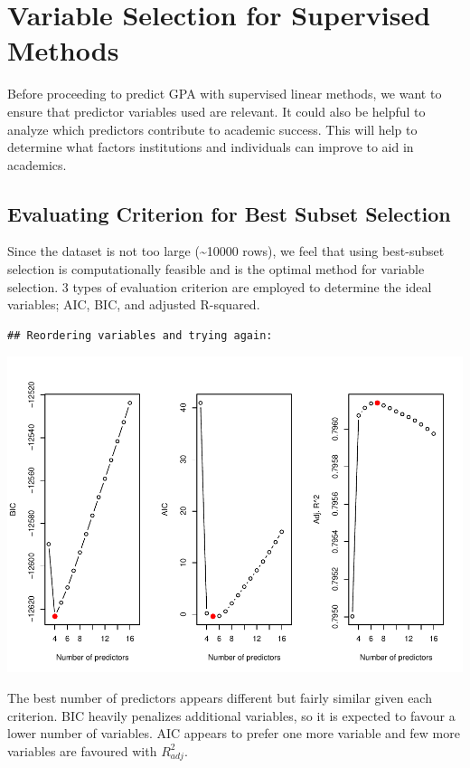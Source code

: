 \documentclass[
]{article}
\begin{document}
\section{Variable Selection for Supervised
Methods}\label{variable-selection-for-supervised-methods}

Before proceeding to predict GPA with supervised linear methods, we want
to ensure that predictor variables used are relevant. It could also be
helpful to analyze which predictors contribute to academic success. This
will help to determine what factors institutions and individuals can
improve to aid in academics.

\subsection{Evaluating Criterion for Best Subset
Selection}\label{evaluating-criterion-for-best-subset-selection}

Since the dataset is not too large (\textasciitilde10000 rows), we feel
that using best-subset selection is computationally feasible and is the
optimal method for variable selection. 3 types of evaluation criterion
are employed to determine the ideal variables; AIC, BIC, and adjusted
R-squared.

\begin{verbatim}
## Reordering variables and trying again:
\end{verbatim}

\includegraphics{ST494_FP_files/figure-latex/unnamed-chunk-17-1.pdf}

The best number of predictors appears different but fairly similar given
each criterion. BIC heavily penalizes additional variables, so it is
expected to favour a lower number of variables. AIC appears to prefer
one more variable and few more variables are favoured with
\(R^2_{adj}\).
\end{document}
